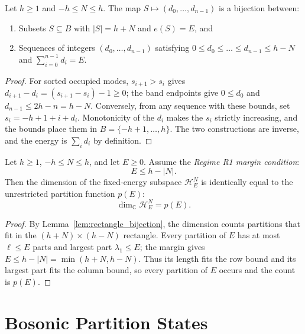 \begin{lemma}
\label{lem:rectangle_bijection}
Let $h \ge 1$ and $-h \le N \le h$. The map $S \mapsto (d_0, \dots, d_{n-1})$ is a bijection between:
\begin{enumerate}
    \item Subsets $S \subseteq B$ with $|S| = h + N$ and $e(S) = E$, and
    \item Sequences of integers $(d_0, \dots, d_{n-1})$ satisfying $0 \le d_0 \le \dots \le d_{n-1} \le h - N$ and $\sum_{i=0}^{n-1} d_i = E$.
\end{enumerate}
\end{lemma}

\begin{proof}
For sorted occupied modes, $s_{i+1}>s_i$ gives
$d_{i+1}-d_i=(s_{i+1}-s_i)-1\ge0$; the band endpoints give
$0\le d_0$ and $d_{n-1}\le2h-n=h-N$. Conversely, from any sequence
with these bounds, set $s_i=-h+1+i+d_i$. Monotonicity of the $d_i$
makes the $s_i$ strictly increasing, and the bounds place them in
$B=\{-h+1,\ldots,h\}$. The two constructions are inverse, and the
energy is $\sum_i d_i$ by definition.
\end{proof}

\begin{theorem}
\label{thm:regime_r1}
Let $h \ge 1$, $-h \le N \le h$, and let $E \ge 0$. Assume the \emph{Regime R1 margin condition}:
\begin{equation}
E \le h-|N|.
\end{equation}
Then the dimension of the fixed-energy subspace $\mathcal{H}^N_E$ is identically equal to the unrestricted partition function $p(E)$:
\begin{equation}
\dim_{\mathbb{C}} \mathcal{H}^N_E = p(E).
\end{equation}
\end{theorem}

\begin{proof}
By Lemma~\ref{lem:rectangle_bijection}, the dimension counts partitions
that fit in the $(h+N)\times(h-N)$ rectangle. Every partition of $E$
has at most $\ell\le E$ parts and largest part $\lambda_1\le E$;
the margin gives $E\le h-|N|=\min(h+N,h-N)$. Thus its length fits
the row bound and its largest part fits the column bound, so every
partition of $E$ occurs and the count is $p(E)$.
\end{proof}

\section{Bosonic Partition States}

